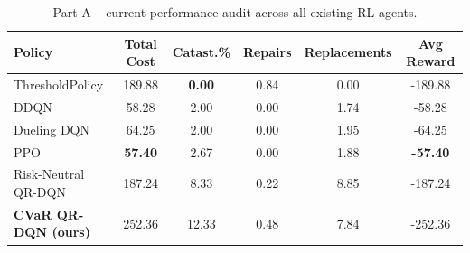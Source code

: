 \begin{table}[t]
\centering
\caption{Part A -- current performance audit across all existing RL agents.}
\label{tab:audit_a}
\begin{tabular}{lccccc}
\toprule
Policy & Total Cost & Catast.\% & Repairs & Replacements & Avg Reward \\
\midrule
ThresholdPolicy & 189.88 & \textbf{0.00} & 0.84 & 0.00 & -189.88 \\
DDQN & 58.28 & 2.00 & 0.00 & 1.74 & -58.28 \\
Dueling DQN & 64.25 & 2.00 & 0.00 & 1.95 & -64.25 \\
PPO & \textbf{57.40} & 2.67 & 0.00 & 1.88 & \textbf{-57.40} \\
Risk-Neutral QR-DQN & 187.24 & 8.33 & 0.22 & 8.85 & -187.24 \\
\textbf{CVaR QR-DQN (ours)} & 252.36 & 12.33 & 0.48 & 7.84 & -252.36 \\
\bottomrule
\end{tabular}
\end{table}
